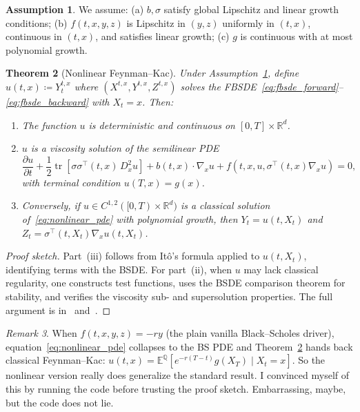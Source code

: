 \documentclass[11pt]{article}
\newtheorem{theorem}{Theorem}[section]
\theoremstyle{definition}
\newtheorem{assumption}[theorem]{Assumption}
\theoremstyle{remark}
\newtheorem{remark}[theorem]{Remark}
\newcommand{\R}{\mathbb{R}}
\newcommand{\E}{\mathbb{E}}
\newcommand{\Q}{\mathbb{Q}}
\DeclareMathOperator{\tr}{tr}
\begin{document}
\begin{assumption}\label{asmp:regularity}
We assume: (a) $b, \sigma$ satisfy global Lipschitz and linear growth
conditions; (b) $f(t,x,y,z)$ is Lipschitz in $(y,z)$ uniformly in $(t,x)$,
continuous in $(t,x)$, and satisfies linear growth; (c) $g$ is continuous
with at most polynomial growth.
\end{assumption}

\begin{theorem}[Nonlinear Feynman--Kac]\label{thm:nonlinear_fk}
Under Assumption~\ref{asmp:regularity}, define
$u(t,x) \coloneqq Y_t^{t,x}$ where $(X^{t,x}, Y^{t,x}, Z^{t,x})$ solves
the FBSDE~\eqref{eq:fbsde_forward}--\eqref{eq:fbsde_backward} with $X_t = x$.
Then:
\begin{enumerate}[label=(\roman*)]
  \item The function $u$ is deterministic and continuous on $[0,T] \times \R^d$.
  \item $u$ is a viscosity solution of the semilinear PDE
  \begin{equation}\label{eq:nonlinear_pde}
    \frac{\partial u}{\partial t}
    + \frac{1}{2}\tr\!\left[\sigma\sigma^\top(t,x)\,D^2_x u\right]
    + b(t,x) \cdot \nabla_x u
    + f\!\left(t, x, u, \sigma^\top(t,x)\nabla_x u\right) = 0,
  \end{equation}
  with terminal condition $u(T,x) = g(x)$.
  \item Conversely, if $u \in C^{1,2}([0,T) \times \R^d)$ is a classical
  solution of~\eqref{eq:nonlinear_pde} with polynomial growth, then
  $Y_t = u(t, X_t)$ and $Z_t = \sigma^\top(t, X_t)\nabla_x u(t, X_t)$.
\end{enumerate}
\end{theorem}

\begin{proof}[Proof sketch]
Part~(iii) follows from It\^{o}'s formula applied to $u(t, X_t)$, identifying
terms with the BSDE.  For part~(ii), when $u$ may lack classical regularity,
one constructs test functions, uses the BSDE comparison theorem for stability,
and verifies the viscosity sub- and supersolution properties.  The full
argument is in~\cite[Chapter~6]{zhang2017backward}
and~\cite{pardoux1990adapted}.
\end{proof}

\begin{remark}
When $f(t,x,y,z) = -ry$ (the plain vanilla Black--Scholes
driver), equation~\eqref{eq:nonlinear_pde} collapses to the BS PDE
and Theorem~\ref{thm:nonlinear_fk} hands back classical Feynman--Kac:
$u(t,x) = \E^\Q[e^{-r(T-t)} g(X_T) \mid X_t = x]$.
So the nonlinear version really does generalize the standard result.
I convinced myself of this by running the code before trusting
the proof sketch. Embarrassing, maybe, but the code does not lie.
\end{remark}
\end{document}
